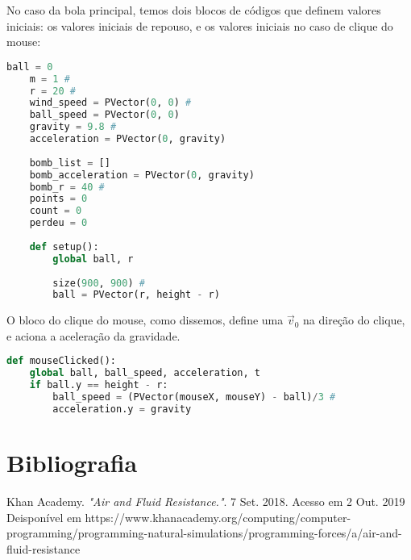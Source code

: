 \documentclass[12pt,letterpaper]{article}
\begin{document}
No caso da bola principal, temos dois blocos de códigos que definem valores iniciais: os valores iniciais de repouso, e os valores iniciais no caso de clique do mouse:

\begin{lstlisting}[language=Python]
    ball = 0
    m = 1 #
    r = 20 #
    wind_speed = PVector(0, 0) #
    ball_speed = PVector(0, 0)
    gravity = 9.8 #
    acceleration = PVector(0, gravity)
    
    bomb_list = []
    bomb_acceleration = PVector(0, gravity)
    bomb_r = 40 #
    points = 0
    count = 0
    perdeu = 0
    
    def setup():
        global ball, r
        
        size(900, 900) #
        ball = PVector(r, height - r)
\end{lstlisting}

O bloco do clique do mouse, como dissemos, define uma $\vec{v}_0$ na direção do clique, e aciona a aceleração da gravidade.

\begin{lstlisting}[language=Python]
    def mouseClicked():
    global ball, ball_speed, acceleration, t
    if ball.y == height - r:
        ball_speed = (PVector(mouseX, mouseY) - ball)/3 #
        acceleration.y = gravity
\end{lstlisting}
\newpage
\section*{Bibliografia}

Khan Academy. \textit{"Air and Fluid Resistance."}. 7 Set. 2018. Acesso em 2 Out. 2019
Deisponível em https://www.khanacademy.org/computing/computer-programming/programming-natural-simulations/programming-forces/a/air-and-fluid-resistance
\end{document}
